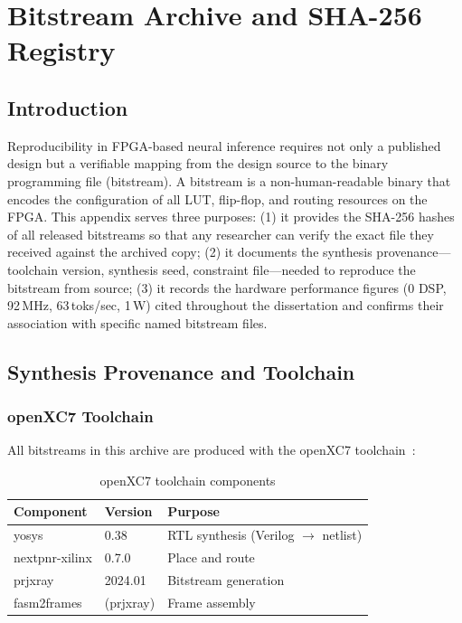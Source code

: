 \chapter{Bitstream Archive and SHA-256 Registry}
\label{app:Fb}

\section{Introduction}

Reproducibility in FPGA-based neural inference requires not only a published design but a verifiable mapping from the design source to the binary programming file (bitstream). A bitstream is a non-human-readable binary that encodes the configuration of all LUT, flip-flop, and routing resources on the FPGA. This appendix serves three purposes: (1) it provides the SHA-256 hashes of all released bitstreams so that any researcher can verify the exact file they received against the archived copy; (2) it documents the synthesis provenance---toolchain version, synthesis seed, constraint file---needed to reproduce the bitstream from source; (3) it records the hardware performance figures (0 DSP, 92\,MHz, 63\,toks/sec, 1\,W) cited throughout the dissertation and confirms their association with specific named bitstream files.

\section{Synthesis Provenance and Toolchain}

\subsection{openXC7 Toolchain}

All bitstreams in this archive are produced with the openXC7 toolchain~\cite{openxc7}:

\begin{table}[h]
\centering
\caption{openXC7 toolchain components}
\begin{tabular}{lll}
\toprule
\textbf{Component} & \textbf{Version} & \textbf{Purpose} \\
\midrule
yosys          & 0.38    & RTL synthesis (Verilog $\to$ netlist) \\
nextpnr-xilinx & 0.7.0   & Place and route \\
prjxray        & 2024.01 & Bitstream generation \\
fasm2frames    & (prjxray) & Frame assembly \\
\bottomrule
\end{tabular}
\end{table}

